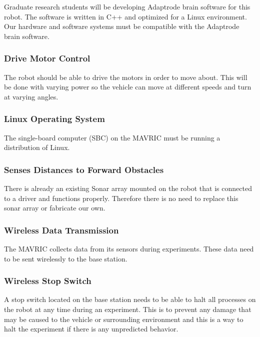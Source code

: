 \documentclass{article}
\begin{document}
            Graduate research students will be developing
            Adaptrode brain software for this robot.
            The software is written in C++
            and optimized for a Linux environment.
            Our hardware and software systems
            must be compatible with the Adaptrode brain software.

        \subsubsection{Drive Motor Control}
        
            The robot should be able to drive the motors in order to move about.
            This will be done with varying power
            so the vehicle can move at different speeds
            and turn at varying angles.

        \subsubsection{Linux Operating System}
        
            The single-board computer (SBC) on the MAVRIC
            must be running a distribution of Linux.

        \subsubsection{Senses Distances to Forward Obstacles}
        
            There is already an existing Sonar array mounted on the robot
            that is connected to a driver and functions properly.
            Therefore there is no need to replace this sonar array
            or fabricate our own.

        \subsubsection{Wireless Data Transmission}
        
            The MAVRIC collects data from its sensors during experiments.
            These data need to be sent wirelessly to the base station.

        \subsubsection{Wireless Stop Switch}
        
            A stop switch located on the base station
            needs to be able to halt all processes on the robot
            at any time during an experiment.
            This is to prevent any damage that may be caused to the vehicle or surrounding environment 
            and this is a way to halt the experiment
            if there is any unpredicted behavior.
\end{document}

